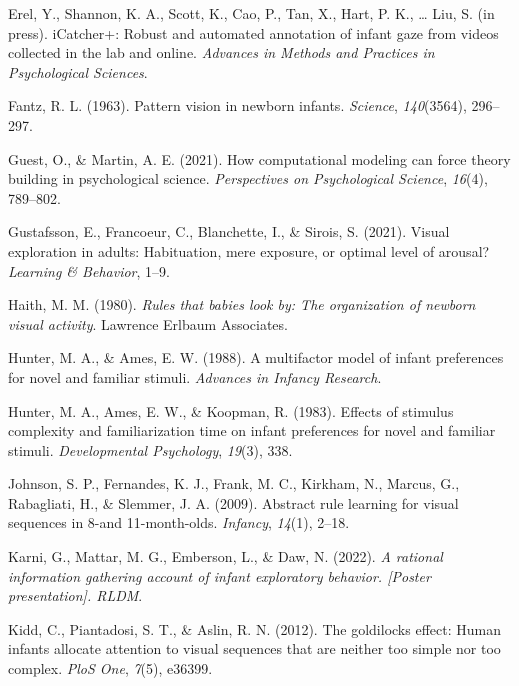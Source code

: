 \documentclass[10pt, letterpaper]{article}
\newenvironment{CSLReferences}%
  {}%
  {\par}
\begin{document}
\begin{CSLReferences}{1}{0}
\leavevmode{}%
Erel, Y., Shannon, K. A., Scott, K., Cao, P., Tan, X., Hart, P. K.,
\ldots{} Liu, S. (in press). iCatcher+: Robust and automated annotation
of infant gaze from videos collected in the lab and online.
\emph{Advances in Methods and Practices in Psychological Sciences}.

\leavevmode{}%
Fantz, R. L. (1963). Pattern vision in newborn infants. \emph{Science},
\emph{140}(3564), 296--297.

\leavevmode{}%
Guest, O., \& Martin, A. E. (2021). How computational modeling can force
theory building in psychological science. \emph{Perspectives on
Psychological Science}, \emph{16}(4), 789--802.

\leavevmode{}%
Gustafsson, E., Francoeur, C., Blanchette, I., \& Sirois, S. (2021).
Visual exploration in adults: Habituation, mere exposure, or optimal
level of arousal? \emph{Learning \& Behavior}, 1--9.

\leavevmode{}%
Haith, M. M. (1980). \emph{Rules that babies look by: The organization
of newborn visual activity}. Lawrence Erlbaum Associates.

\leavevmode{}%
Hunter, M. A., \& Ames, E. W. (1988). A multifactor model of infant
preferences for novel and familiar stimuli. \emph{Advances in Infancy
Research}.

\leavevmode{}%
Hunter, M. A., Ames, E. W., \& Koopman, R. (1983). Effects of stimulus
complexity and familiarization time on infant preferences for novel and
familiar stimuli. \emph{Developmental Psychology}, \emph{19}(3), 338.

\leavevmode{}%
Johnson, S. P., Fernandes, K. J., Frank, M. C., Kirkham, N., Marcus, G.,
Rabagliati, H., \& Slemmer, J. A. (2009). Abstract rule learning for
visual sequences in 8-and 11-month-olds. \emph{Infancy}, \emph{14}(1),
2--18.

\leavevmode{}%
Karni, G., Mattar, M. G., Emberson, L., \& Daw, N. (2022). \emph{A
rational information gathering account of infant exploratory behavior.
{[}Poster presentation{]}. RLDM}.

\leavevmode{}%
Kidd, C., Piantadosi, S. T., \& Aslin, R. N. (2012). The goldilocks
effect: Human infants allocate attention to visual sequences that are
neither too simple nor too complex. \emph{PloS One}, \emph{7}(5),
e36399.


\end{CSLReferences}
\end{document}
